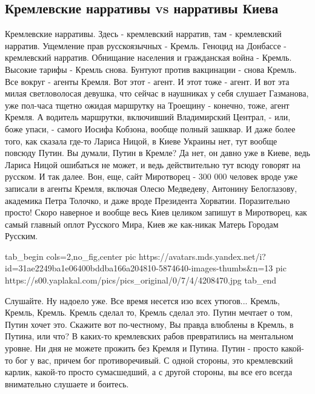  
 
 
 
 

\subsection{Кремлевские нарративы vs нарративы Киева}

Кремлевские нарративы. Здесь - кремлевский нарратив, там - кремлевский
нарратив. Ущемление прав русскоязычных - Кремль. Геноцид на Донбассе -
кремлевский нарратив. Обнищание населения и гражданская война - Кремль. Высокие
тарифы - Кремль снова. Бунтуют против вакцинации - снова Кремль.  Все вокруг -
агенты Кремля. Вот этот - агент. И этот тоже - агент. И вот эта милая
светловолосая девушка, что сейчас в наушниках у себя слушает Газманова, уже
пол-часа тщетно ожидая маршрутку на Троещину - конечно, тоже, агент Кремля. А
водитель маршрутки, включивший Владимирский Централ, - или, боже упаси, -
самого Иосифа Кобзона, вообще полный зашквар. И даже более того, как сказала
где-то Лариса Ницой, в Киеве Украины нет, тут вообще повсюду Путин. Вы думали,
Путин в Кремле? Да нет, он давно уже в Киеве, ведь Лариса Ницой ошибаться не
может, и ведь действительно тут всюду говорят на русском. И так далее. Вон,
еще, сайт Миротворец - 300 000 человек вроде уже записали в агенты Кремля,
включая Олесю Медведеву, Антонину Белоглазову, академика Петра Толочко, и даже
вроде Президента Хорватии. Поразительно просто! Скоро наверное и вообще весь
Киев целиком запишут в Миротворец, как самый главный оплот Русского Мира, Киев
же как-никак Матерь Городам Русским.

\ifcmt
  tab_begin cols=2,no_fig,center
     pic https://avatars.mds.yandex.net/i?id=31ae2249ba1e06400bddba166a204810-5874640-images-thumbs&n=13
		 pic https://s00.yaplakal.com/pics/pics_original/0/7/4/4208470.jpg
  tab_end
\fi

Слушайте. Ну надоело уже. Все время несется изо всех утюгов... Кремль, Кремль,
Кремль. Кремль сделал то, Кремль сделал это. Путин мечтает о том, Путин хочет
это. Скажите вот по-честному, Вы правда влюблены в Кремль, в Путина, или что? В
каких-то кремлевских рабов превратились на ментальном уровне. Ни дня не можете
прожить без Кремля и Путина. Путин - просто какой-то бог у вас, причем бог
противоречивый. С одной стороны, это кремлевский карлик, какой-то просто
сумасшедший, а с другой стороны, вы все его всегда внимательно слушаете и
боитесь. 

